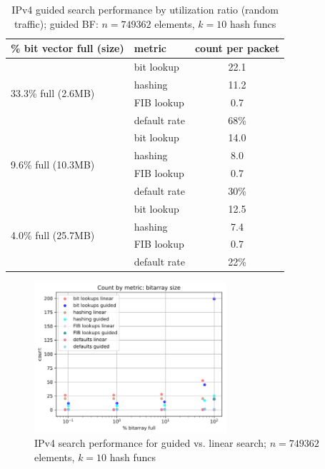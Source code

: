 \documentclass[conference,compsoc]{IEEEtran}
\begin{document}
\begin{table}[]
\centering
\caption{IPv4 guided search performance by utilization ratio (random traffic); guided BF: $n=749362$ elements, $k=10$ hash funcs}
\label{tab:utilization}

\begin{tabular}{llcl}
\hline
\textbf{\% bit vector full (size)}              & \textbf{metric} & \multicolumn{2}{l}{\textbf{count per packet}} \\ \hline
\multirow{4}{*}{33.3\% full (2.6MB)} & bit lookup      & \multicolumn{2}{c}{22.1}                           \\
                                     & hashing         & \multicolumn{2}{c}{11.2}                           \\
                                     & FIB lookup      & \multicolumn{2}{c}{0.7}                            \\
                                     & default rate    & \multicolumn{2}{c}{68\%}                           \\ \hline
\multirow{4}{*}{9.6\% full (10.3MB)} & bit lookup      & \multicolumn{2}{c}{14.0}                           \\
                                     & hashing         & \multicolumn{2}{c}{8.0}                            \\
                                     & FIB lookup      & \multicolumn{2}{c}{0.7}                            \\
                                     & default rate    & \multicolumn{2}{c}{30\%}                           \\ \hline
\multirow{4}{*}{4.0\% full (25.7MB)} & bit lookup      & \multicolumn{2}{c}{12.5}                           \\
                                     & hashing         & \multicolumn{2}{c}{7.4}                            \\
                                     & FIB lookup      & \multicolumn{2}{c}{0.7}                            \\
                                     & default rate    & \multicolumn{2}{c}{22\%}                           \\ \hline
\end{tabular}
\end{table}


\begin{figure}[h]
\centering
\includegraphics[height=2.2in]{../img/bitarraySize_v4_random.png}
  \caption{IPv4 search performance for guided vs. linear search; $n=749362$ elements, $k=10$ hash funcs}
\label{fig:utilization}
\end{figure}
\end{document}
